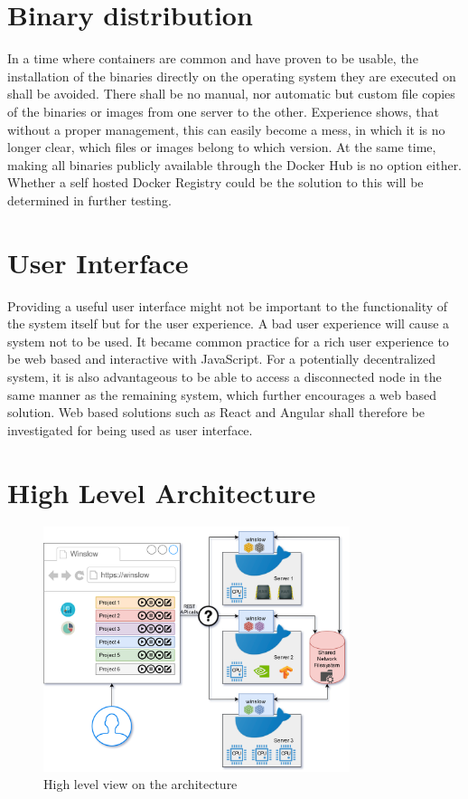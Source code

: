 \section{Binary distribution}

In a time where containers are common and have proven to be usable, the installation of the binaries directly on the operating system they are executed on shall be avoided.
There shall be no manual, nor automatic but custom file copies of the binaries or images from one server to the other.
Experience shows, that without a proper management, this can easily become a mess, in which it is no longer clear, which files or images belong to which version.
At the same time, making all binaries publicly available through the Docker Hub\cite{docker:hub} is no option either.
Whether a self hosted Docker Registry\cite{docker:registry} could be the solution to this will be determined in further testing.

\section{User Interface}

Providing a useful user interface might not be important to the functionality of the system itself but for the user experience.
A bad user experience will cause a system not to be used.
It became common practice for a rich user experience to be web based and interactive with JavaScript.
For a potentially decentralized system, it is also advantageous to be able to access a disconnected node in the same manner as the remaining system, which further encourages a web based solution.
Web based solutions such as React and Angular shall therefore be investigated for being used as user interface.


\section{High Level Architecture}


\begin{figure}[h]
	\centering
	\includegraphics[width=0.8\textwidth]{architecture.png}
	\caption{High level view on the architecture}
	\label{architecture:high-level}
\end{figure}


